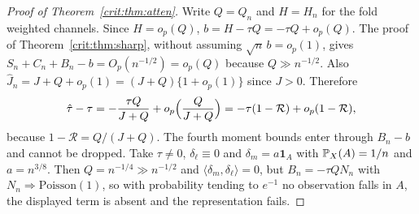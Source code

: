 \begin{proof}[Proof of Theorem~\ref{crit:thm:atten}]
Write $Q=Q_n$ and $H=H_n$ for the fold weighted channels. Since $H=o_p(Q)$, $b=H-\tau Q=-\tau Q+o_p(Q)$. The proof of Theorem~\ref{crit:thm:sharp}, without assuming $\sqrt n\,b=o_p(1)$, gives $S_n+C_n+B_n-b=O_p(n^{-1/2})=o_p(Q)$ because $Q\gg n^{-1/2}$. Also $\hat J_n=J+Q+o_p(1)=(J+Q)\{1+o_p(1)\}$ since $J>0$. Therefore
\[
\hat\tau - \tau = -\frac{\tau Q}{J + Q} + o_p\Bigl(\frac{Q}{J + Q}\Bigr) = -\tau(1 - \mathcal R) + o_p(1 - \mathcal R),
\]
because $1 - \mathcal R = Q/(J + Q)$. The fourth moment bounds enter through $B_n - b$ and cannot be dropped. Take $\tau \ne 0$, $\delta_\ell \equiv 0$ and $\delta_m = a\mathbf 1_A$ with $\mathbb{P}_X(A) = 1/n$ and $a = n^{3/8}$. Then $Q = n^{-1/4} \gg n^{-1/2}$ and $\langle\delta_m,\delta_\ell\rangle = 0$, but $B_n = -\tau QN_n$ with $N_n \Rightarrow \mathrm{Poisson}(1)$, so with probability tending to $e^{-1}$ no observation falls in $A$, the displayed term is absent and the representation fails.
\end{proof}

